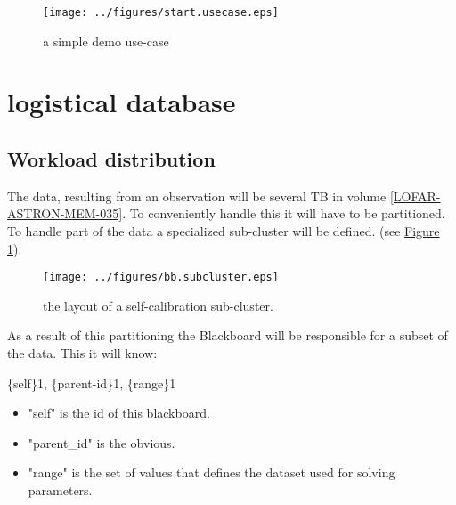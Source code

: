 \documentclass[]{lofar}
\begin{document}
      \begin{figure}
        \texttt{[image: ../figures/start.usecase.eps]}
        \hypertarget{fig:start.usecase}{}
        \caption{a simple demo use-case\label{fig:start.usecase}}
      \end{figure}

  \section{logistical database}
  \label{sec:logistical-datamodel}
  \hypertarget{sec:logistical-datamodel}{}

    \subsection{Workload distribution}
    \label{id2721376}\hypertarget{id2721376}{}

      The data, resulting from an observation will be several TB in
      volume
      \hyperlink{LOFAR-ASTRON-MEM-035}{[LOFAR-ASTRON-MEM-035]}. To
      conveniently handle this it will have to be partitioned. To
      handle part of the data a specialized sub-cluster will be
      defined. (see \hyperlink{subcluster}{Figure 1}).

      \begin{figure}
        \texttt{[image: ../figures/bb.subcluster.eps]}
        \hypertarget{fig:bb.subcluster}{}
        \caption{the layout of a self-calibration sub-cluster.\label{fig:bb.subcluster}}
      \end{figure}

      As a result of this partitioning the Blackboard will be
      responsible for a subset of the data. This it will know:

      \{self\}1, \{parent-id\}1, \{range\}1

      \begin{itemize}

        \item 

          "self" is the id of this blackboard.

        \item 

          "parent\_id" is the obvious.

        \item 

          "range" is the set of values that defines the dataset used
          for solving parameters.

      \end{itemize}
\end{document}
